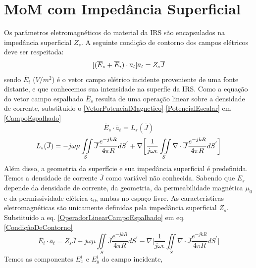 \documentclass[
	12pt,				%
	openright,			%
	oneside,			%
	a4paper,			%
	english,			%
	brazil				%
	]{abntex2}
\begin{document}
\section{MoM com Impedância Superficial}

Os parâmetros eletromagnéticos do material da IRS são encapsulados na impedância superficial $Z_s$. A seguinte condição de contorno dos campos elétricos deve ser respeitada:
  \begin{equation}{\label{CondiçãoDeContorno}}
    [(\overline{E}_s+\overline{E}_{i})\cdot \overline{a}_t]\overline{a}_t=Z_s\overline{J}
  \end{equation}
sendo $\overline{E}_i$ ($V/m^2$) é o vetor campo elétrico incidente proveniente de uma fonte distante, e que conhecemos sua intensidade na superfíe da IRS. Como a equação do vetor campo espalhado $\overline{E}_s$ resulta de uma operação linear  sobre a densidade de corrente, substituido o \ref{VetorPotencialMagnetico}-\ref{PotencialEscalar} em \ref{CampoEspalhado}
\begin{equation}
    \overline{E}_s \cdot \overline{a}_t=L_s(\overline{J})
\end{equation}
  \begin{equation}{\label{OperadorLinearCampoEspalhado}}
      L_s(\overline{J})= -j\omega \mu \iint\limits_S\overline{J} \frac{e^{-j k R}}{4 \pi R} dS^{'} +
    \nabla \biggl[ \frac{1}{j\omega \epsilon}\iint\limits_S \nabla \cdot \overline{J}\frac{e^{-j k R}}{4 \pi R} dS^{'}  \biggl] 
  \end{equation}
Além disso, a geometria da superfície e sua impedância superficial é predefinida. Temos a densidade de corrente $\overline{J}$ como variável não conhecida. Sabendo que $E_s$ depende da densidade de corrente, da geometria,  da permeabilidade magnética  $\mu_0$ e da permissividade elétrica $\epsilon_0$, ambas no espaço livre. As caracteristicas eletromagnéticas são unicamente definidas pela impedância superficial $Z_s$. Substituido a eq. \ref{OperadorLinearCampoEspalhado} em eq. \ref{CondiçãoDeContorno}
\begin{equation}
\overline{E}_{i}\cdot \overline{a}_t=Z_s\overline{J}+j\omega \mu \iint\limits_S\overline{J} \frac{e^{-j k R}}{4 \pi R} dS^{'} -
    \nabla \biggl[ \frac{1}{j\omega \epsilon}\iint\limits_S \nabla \cdot \overline{J}\frac{e^{-j k R}}{4 \pi R} dS^{'}  \biggl] 
\end{equation}
Temos as componentes $E_x^{i}$ e $E_y^{i}$ do campo incidente,
\end{document}
